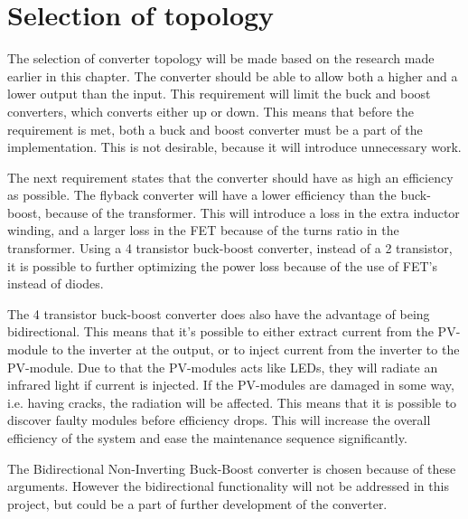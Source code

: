 \section{Selection of topology}
The selection of converter topology will be made based on the research made earlier in this chapter. The converter should be able to allow both a higher and a lower output than the input. This requirement will limit the buck and boost converters, which converts either up or down. This means that before the requirement is met, both a buck and boost converter must be a part of the implementation. This is not desirable, because it will introduce unnecessary work.  

The next requirement states that the converter should have as high an efficiency as possible. The flyback converter will have a lower efficiency than the buck-boost, because of the transformer. This will introduce a loss in the extra inductor winding, and a larger loss in the FET because of the turns ratio in the transformer. Using a 4 transistor buck-boost converter, instead of a 2 transistor, it is possible to further optimizing the power loss because of the use of FET's instead of diodes. 

The 4 transistor buck-boost converter does also have the advantage of being bidirectional. This means that it's possible to either extract current from the PV-module to the inverter at the output, or to inject current from the inverter to the PV-module. Due to that the PV-modules acts like LEDs, they will radiate an infrared light if current is injected. If the PV-modules are damaged in some way, i.e. having cracks, the radiation will be affected. This means that it is possible to discover faulty modules before efficiency drops. This will increase the overall efficiency of the system and ease the maintenance sequence significantly. 

The Bidirectional Non-Inverting Buck-Boost converter is chosen because of these arguments. However the bidirectional functionality will not be addressed in this project, but could be a part of further development of the converter. 






 